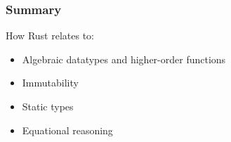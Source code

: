\documentclass[t]{beamer}
\begin{document}
\begin{frame}[c,fragile]
\begin{center}
\end{center}
\end{frame}


\begin{frame}[c]
\frametitle{Summary}

How Rust relates to:

\begin{itemize}
\item Algebraic datatypes and higher-order functions
\item Immutability
\item Static types
\item Equational reasoning
\end{itemize}

\end{frame}
\end{document}
